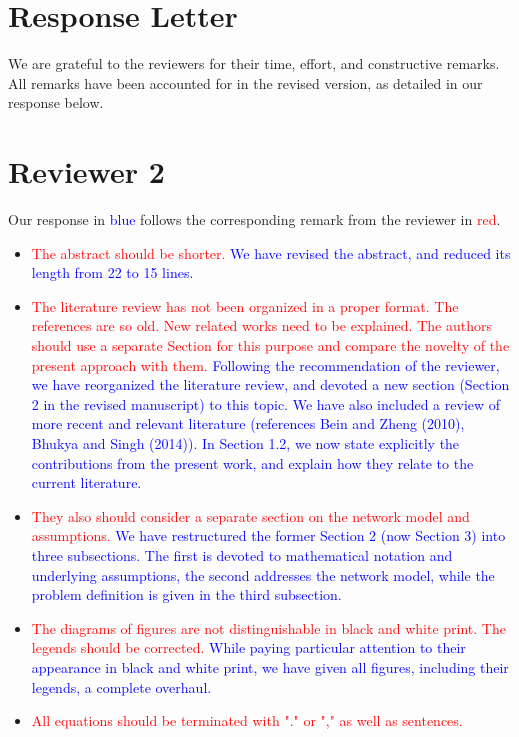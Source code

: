 \documentclass[12pt]{article}
\begin{document}
\section*{Response Letter}
We are grateful to the reviewers for their time, effort, and constructive remarks.
All remarks have been accounted for in the revised version, as detailed in our response below.

\section*{Reviewer 2}
Our response in \textcolor{blue}{blue} follows the corresponding remark from the reviewer in \textcolor{red}{red}.

\begin{itemize}
\item \textcolor{red}{The abstract should be shorter.} \textcolor{blue}{
We have revised the abstract, and reduced its length from 22 to 15 lines.
}
\item \textcolor{red}{The literature review has not been organized in a proper format. The references are so old. New related works need to be explained. The authors should use a separate Section for this purpose and compare the novelty of the present approach with them.} \textcolor{blue}{
Following the recommendation of the reviewer, we have reorganized the literature review, and devoted a new section (Section 2 in the revised manuscript)
to this topic. We have also included a review of more recent and relevant literature (references Bein and Zheng (2010), Bhukya and Singh (2014)).
In Section 1.2, we now state explicitly the contributions from the present work, and explain how they relate to the current literature.
}
\item \textcolor{red}{They also should consider a separate section on the network model and assumptions.} \textcolor{blue}{
We have restructured the former Section 2 (now Section 3) into three subsections.
The first is devoted to mathematical notation and underlying assumptions, the second addresses the network model,
while the problem definition is given in the third subsection.
}
\item \textcolor{red}{The diagrams of figures are not distinguishable in black and white print. The legends should be corrected.} \textcolor{blue}{
While paying particular attention to their appearance in black and white print, we have given all figures,
including their legends, a complete overhaul.
}
\item \textcolor{red}{All equations should be terminated with "." or "," as well as sentences.} \textcolor{blue}{
}
\end{itemize}
\end{document}
